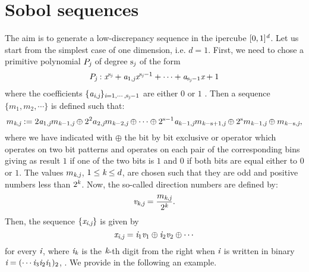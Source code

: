 \section{Sobol sequences}
The aim is to generate a low-discrepancy sequence in the ipercube $[0,1]^{\textit{d}}$. 
Let us start from the simplest case of one dimension, i.e. $d=1$. First, we need to chose a primitive polynomial $P_{\textit{j}}$ of degree $\textrm{s}_{\textit{j}}$ of the form
\begin{equation}
P_{\textit{j}}:\textit{x}^{\textrm{s}_{\textit{j}}}+\textit{a}_{1, \textit{j}}\textit{x}^{\textrm{s}_{\textit{j}}-1}+\cdots+\textit{a}_{\textrm{s}_{\textit{j}}-1}\textit{x}+1
\end{equation}
where the coefficients $\{\textit{a}_{\textit{i},\textit{j}}\}_{\textit{i}= 1, \cdots, \textrm{s}_{\textit{j}}-1}$ are either $0$ or $1$ \cite{joe2008constructing}. 
Then a sequence $\{m_1,m_2,\cdots\}$ is defined such that:
\begin{equation}\label{eq:m}
m_{\textit{k}, \textit{j}} := 2\textit{a}_{1, \textit{j}}m_{\textit{k}-1, \textit{j}}\oplus 2^2a_{2, \textit{j}}m_{\textit{k}-2, \textit{j}}\oplus \cdots \oplus 2^{\textrm{s}-1}\textit{a}_{\textit{k}-1, \textit{j}}m_{\textit{k}-\textrm{s}+1, \textit{j}}\oplus 2^{\textrm{s}}m_{\textit{k}-1, \textit{j}}\oplus m_{\textit{k}-\textrm{s}, \textit{j}},
\end{equation}
where we have indicated with $\oplus$ the bit by bit exclusive or operator which operates on two bit patterns and operates on each pair of the corresponding bins giving as result $1$ if one of the two bits is $1$ and $0$ if both bits are equal either to $0$ or $1$. The values $m_{\textit{k}, \textit{j}}$, $1\leq\textit{k}\leq d$, are chosen such that they are odd and positive numbers less than $2^{\textit{k}}$. Now, the so-called direction numbers are defined by:
\begin{equation}\label{eq:dir_numb}
\textit{v}_{\textit{k}, \textit{j}}=\frac{m_{\textit{k}, \textit{j}}}{2^{\textit{k}}}.
\end{equation}
Then, the sequence $\{\textit{x}_{\textit{i}, \textit{j}}\}$ is given by
\begin{equation}\label{eq:x}
\textit{x}_{\textit{i}, \textit{j}} = \textit{i}_1\textit{v}_1\oplus \textit{i}_2\textit{v}_{2}\oplus \cdots
\end{equation}
for every $\textit{i}$, where $\textit{i}_{\textit{k}}$ is the $\textit{k}$-th digit from the right when $\textit{i}$ is written in binary $\textit{i} = (\cdots \textit{i}_3\textit{i}_2\textit{i}_1)_2$, \cite{joe2008notes}. We provide in the following an example. \\ \indent
